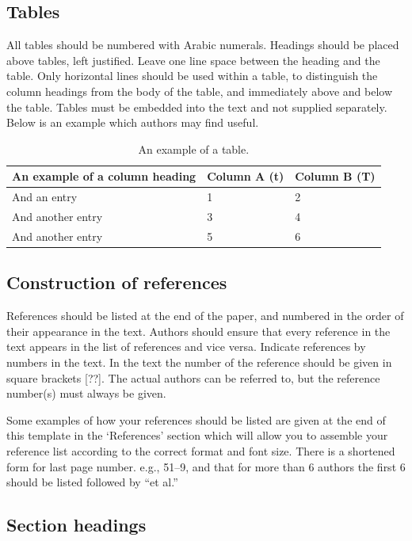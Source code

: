 \documentclass[3p,times,procedia]{elsarticle}
\begin{document}
\subsection{ Tables}

All tables should be numbered with Arabic numerals. Headings should be placed above tables, left justified. Leave one line space between the heading and the table. Only horizontal lines should be used within a table, to distinguish the column headings from the body of the table, and immediately above and below the table. Tables must be embedded into the text and not supplied separately. Below is an example which authors may find useful.

\begin{table}[h]
\caption{An example of a table.}
\begin{tabular*}{\hsize}{@{\extracolsep{\fill}}lll@{}}
\hline
An example of a column heading & Column A (t) & Column B (T)\\
\hline
And an entry &   1 &  2\\
And another entry  & 3 &  4\\
And another entry &  5 &  6\\
\hline
\end{tabular*}
\end{table}


\subsection{Construction of references}

References should be listed at the end of the paper, and numbered in the order of their appearance in the text. Authors should ensure that every reference in the text appears in the list of references and vice versa. Indicate references by numbers in the text. In the text the number of the reference should be given in square brackets [??]. The actual authors can be referred to, but the reference number(s) must always be given.

Some examples of how your references should be listed are given at the end of this template in the ‘References’ section which will allow you to assemble your reference list according to the correct format and font size. There is a shortened form for last page number. e.g., 51–9, and that for more than 6 authors the first 6 should be listed followed by “et al.”


\subsection{Section headings}
\end{document}
